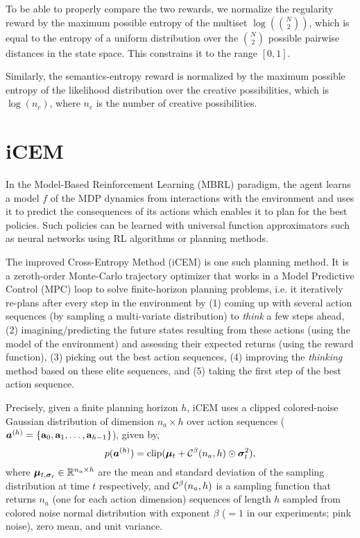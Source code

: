 To be able to properly compare the two rewards, we normalize the regularity reward by the maximum possible entropy of the multiset \(\log\left(\binom{N}{2}\right)\), which is equal to the entropy of a uniform distribution over the \(\binom{N}{2}\) possible pairwise distances in the state space.
This constrains it to the range \([0, 1]\).

Similarly, the semantics-entropy reward is normalized by the maximum possible entropy of the likelihood distribution over the creative possibilities, which is \(\log(n_c)\), where \(n_c\) is the number of creative possibilities.

\section{iCEM}
\label{sec:icem}

In the Model-Based Reinforcement Learning (MBRL) paradigm, the agent learns a model \(f\) of the MDP dynamics from interactions with the environment and uses it to predict the consequences of its actions which enables it to plan for the best policies.
Such policies can be learned with universal function approximators such as neural networks using RL algorithms or planning methods.

The improved Cross-Entropy Method (iCEM) is one such planning method.
It is a zeroth-order Monte-Carlo trajectory optimizer that works in a Model Predictive Control (MPC) loop to solve finite-horizon planning problems, i.e. it iteratively re-plans after every step in the environment by (1) coming up with several action sequences (by sampling a multi-variate distribution) to \emph{think} a few steps ahead, (2) imagining/predicting the future states resulting from these actions (using the model of the environment) and assessing their expected returns (using the reward function), (3) picking out the best action sequences, (4) improving the \emph{thinking} method based on these elite sequences, and (5) taking the first step of the best action sequence.

Precisely, given a finite planning horizon \(h\), iCEM uses a clipped colored-noise Gaussian distribution of dimension \(n_a \times h\) over action sequences (\(\bm{a}^{(h)} = \{ \mathbf{a}_0, \mathbf{a}_1, \ldots, \mathbf{a}_{h-1} \}\)), given by,
\begin{equation}
    \label{eq:icem-distribution}
    p(\bm{a}^{(h)}) = \text{clip}(\bm{\mu}_t + \mathcal{C}^\beta(n_a, h) \odot \bm{\sigma}_t^2),
\end{equation}
where \(\bm{\mu}_{t, \bm{\sigma}_{t}} \in \mathbb{R}^{n_a \times h}\) are the mean and standard deviation of the sampling distribution at time \(t\) respectively, and \(\mathcal{C}^\beta(n_a, h)\) is a sampling function that returns \(n_a\) (one for each action dimension) sequences of length \(h\) sampled from colored noise normal distribution with exponent \(\beta\) (\(= 1\) in our experiments; pink noise), zero mean, and unit variance.

